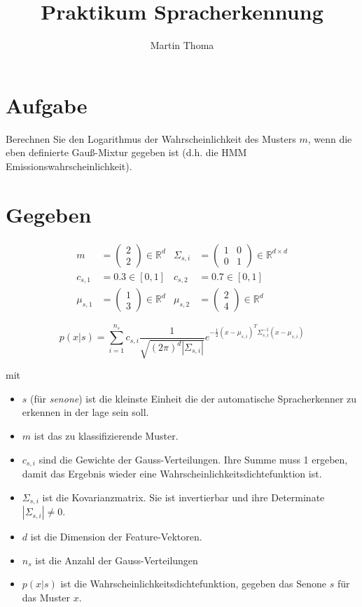 \documentclass[a4paper]{scrartcl}
\title{Praktikum Spracherkennung}
\author{Martin Thoma}
\begin{document}
\section{Aufgabe}
Berechnen Sie den Logarithmus der Wahrscheinlichkeit des Musters $m$, wenn die
eben definierte Gauß-Mixtur gegeben ist (d.h. die HMM
Emissionswahrscheinlichkeit).

\section{Gegeben}

\begin{align}
    m &= \begin{pmatrix}2\\2\end{pmatrix} \in \mathbb{R}^d & \Sigma_{s,i} &= \begin{pmatrix}1 & 0 \\0 & 1\end{pmatrix}  \in \mathbb{R}^{d \times d}\\
    c_{s,1} &= 0.3 \in [0,1]  & c_{s,2} &= 0.7 \in [0,1]\\
    \mu_{s,1} &= \begin{pmatrix}1\\3\end{pmatrix}  \in \mathbb{R}^d & \mu_{s,2} &= \begin{pmatrix}2\\4\end{pmatrix}  \in \mathbb{R}^d
\end{align}

\[p(x|s) = \sum_{i=1}^{n_s} c_{s, i} \frac{1}{\sqrt{(2 \pi)^d |\Sigma_{s,i}|}} e^{-\frac{1}{2} {(x-\mu_{s,i})}^T \Sigma_{s,i}^{-1}(x-\mu_{s,i})}\]

mit

\begin{itemize}
    \item $s$ (für \textit{senone}) ist die kleinste Einheit die der
          automatische Spracherkenner zu erkennen in der lage sein soll.
    \item $m$ ist das zu klassifizierende Muster.
    \item $c_{s,i}$ sind die Gewichte der Gauss-Verteilungen. Ihre Summe muss
          1 ergeben, damit das Ergebnis wieder eine
          Wahrscheinlichkeitsdichtefunktion ist.
    \item $\Sigma_{s,i}$ ist die Kovarianzmatrix. Sie ist invertierbar und
          ihre Determinate $|\Sigma_{s,i}| \neq 0$.
    \item $d$ ist die Dimension der Feature-Vektoren.
    \item $n_s$ ist die Anzahl der Gauss-Verteilungen
    \item $p(x|s)$ ist die Wahrscheinlichkeitsdichtefunktion, gegeben das
          Senone $s$ für das Muster $x$.
\end{itemize}
\end{document}

